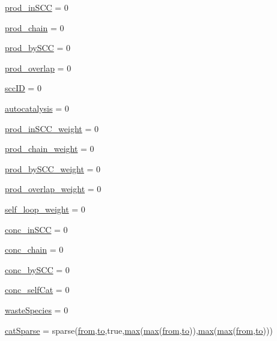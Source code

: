 \begin{DoxyCompactItemize}
\item 
\hyperlink{a00028_a4af96d327ccc28de3433ec07f61e2617}{prod\-\_\-in\-S\-C\-C} = 0
\item 
\hyperlink{a00028_ae0bd6421b7c81047a5234aeeb707efc4}{prod\-\_\-chain} = 0
\item 
\hyperlink{a00028_a9c39bd233d632a4392a969b0ba0ac2bd}{prod\-\_\-by\-S\-C\-C} = 0
\item 
\hyperlink{a00028_a0aa4c3fee8d2729e5b7aa511a3100685}{prod\-\_\-overlap} = 0
\item 
\hyperlink{a00028_a85ff953f350ff6660d5f3489e31d57b6}{scc\-I\-D} = 0
\item 
\hyperlink{a00028_a2d0b5f62c8a18e8cbfeb15c6f8856c5a}{autocatalysis} = 0
\item 
\hyperlink{a00028_aeb0c708cea53f4ecbc2e1a8fad331f3b}{prod\-\_\-in\-S\-C\-C\-\_\-weight} = 0
\item 
\hyperlink{a00028_a0924b7317732c12de281bee31879470d}{prod\-\_\-chain\-\_\-weight} = 0
\item 
\hyperlink{a00028_aac9f4f22f537f0fc5fd69163676333af}{prod\-\_\-by\-S\-C\-C\-\_\-weight} = 0
\item 
\hyperlink{a00028_a75fbcaf1e595fc3264e0cba051e4ba02}{prod\-\_\-overlap\-\_\-weight} = 0
\item 
\hyperlink{a00028_a8c1a84735122e25dcd5f68a0bf4c312b}{self\-\_\-loop\-\_\-weight} = 0
\item 
\hyperlink{a00028_a2ac2f79c8327273bba427ba3e8d2cfbe}{conc\-\_\-in\-S\-C\-C} = 0
\item 
\hyperlink{a00028_a0c333384119ea83494f4b4310ac18eea}{conc\-\_\-chain} = 0
\item 
\hyperlink{a00028_a5884b552ac8657e68e86a84f3d6c173a}{conc\-\_\-by\-S\-C\-C} = 0
\item 
\hyperlink{a00028_a2a45c56ac35d4906cc4a8363b98b1caa}{conc\-\_\-self\-Cat} = 0
\item 
\hyperlink{a00028_a4648745d0256487cb11cb5235f3b9be3}{waste\-Species} = 0
\item 
\hyperlink{a00028_af1693f05ef323ea183b39bc85226c0a8}{cat\-Sparse} = sparse(\hyperlink{a00028_aa7b4fe13e75a69fca72862effeaf6196}{from},\hyperlink{a00028_af71dbe52628a3f83a77ab494817525c6}{to},true,\hyperlink{a00062_a6d9c24e62aee61f54530163edf684ae2}{max}(\hyperlink{a00062_a6d9c24e62aee61f54530163edf684ae2}{max}(\hyperlink{a00028_aa7b4fe13e75a69fca72862effeaf6196}{from},\hyperlink{a00028_af71dbe52628a3f83a77ab494817525c6}{to})),\hyperlink{a00062_a6d9c24e62aee61f54530163edf684ae2}{max}(\hyperlink{a00062_a6d9c24e62aee61f54530163edf684ae2}{max}(\hyperlink{a00028_aa7b4fe13e75a69fca72862effeaf6196}{from},\hyperlink{a00028_af71dbe52628a3f83a77ab494817525c6}{to})))

\end{DoxyCompactItemize}
